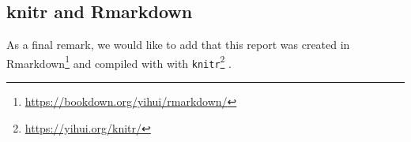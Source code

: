 \documentclass[
  11pt,
]{article}
\begin{document}
\hypertarget{knitr-and-rmarkdown}{%
\subsection{knitr and Rmarkdown}\label{knitr-and-rmarkdown}}

As a final remark, we would like to add that this report was created in
Rmarkdown\footnote{\url{https://bookdown.org/yihui/rmarkdown/}} and
compiled with with \texttt{knitr}\footnote{\url{https://yihui.org/knitr/}
} .

  
\end{document}
